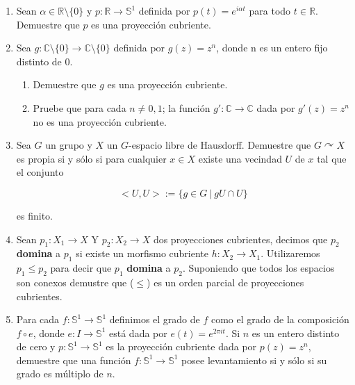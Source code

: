 \begin{enumerate}

\item Sean $\alpha \in \mathbb R \setminus \lbrace0\rbrace$ y $p:\mathbb{R} \rightarrow \mathbb S^1$ definida por $p(t) = e^{i\alpha t}$ para todo $t \in \mathbb{R}$. Demuestre que $p$ es una proyecci\'on cubriente.\\


\item Sea $g: \mathbb C \setminus \lbrace 0 \rbrace \rightarrow  \mathbb C \setminus \lbrace 0 \rbrace$ definida por $g(z) = z^n$, donde n es un entero fijo distinto de 0.
 
 \begin{enumerate}
 
\item Demuestre que $g$ es una proyecci\'on cubriente.
\item Pruebe que para cada $n \neq 0,1$; la funci\'on $g': \mathbb{C} \rightarrow \mathbb{C}$ dada por $g'(z) = z^n$ no es una proyecci\'on cubriente.\\

 \end{enumerate}

\item Sea $G$ un grupo y $X$ un $G$-espacio libre de Hausdorff. Demuestre que $G \curvearrowright X$ es propia si y s\'olo si para cualquier $x \in X$ existe una vecindad $U$ de $x$ tal que el conjunto

$$ <U,U> := \lbrace g \in G \: | \: gU \cap U\rbrace $$ 

es finito.\\

\item Sean $p_1: X_1 \rightarrow X$ Y $p_2: X_2 \rightarrow X$ dos proyecciones cubrientes, decimos que $p_2$ \textbf{domina} a $p_1$ si existe un morfismo cubriente $h:X_2 \rightarrow X_1$. Utilizaremos $p_1 \leq p_2$ para decir que $p_1$ \textbf{domina} a $p_2$. Suponiendo que todos los espacios son conexos demustre que ($\leq$) es un orden parcial de proyecciones cubrientes.\\

\item Para cada $f: \mathbb S^1 \rightarrow \mathbb S^1$ definimos el grado de $f$ como el grado de la composici\'on $f \circ e$, donde $e: I \rightarrow \mathbb S^1$ est\'a dada por $e(t) = e^{2 \pi it}$. Si $n$ es un entero distinto de cero y $p: \mathbb S^1  \rightarrow \mathbb S^1$ es la proyecci\'on cubriente dada por $p(z) = z^n$, demuestre que una funci\'on $f: \mathbb S^1 \rightarrow \mathbb S^1$ posee levantamiento si y s\'olo si su grado es m\'ultiplo de $n$.\\


\end{enumerate}
